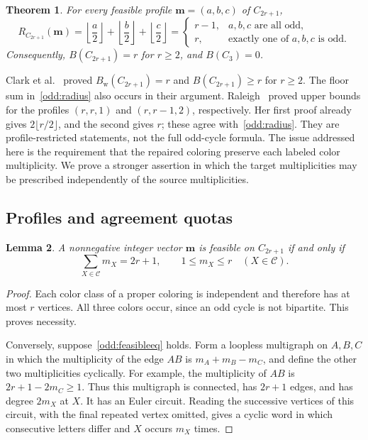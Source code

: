 \documentclass[10pt,a4paper]{amsart}
\numberwithin{equation}{section}
\newtheorem{theorem}{Theorem}[section]
\newtheorem{lemma}[theorem]{Lemma}
\theoremstyle{definition}
\theoremstyle{remark}
\begin{document}
\begin{theorem}\label{odd:main}
For every feasible profile $\mathbf m=(a,b,c)$ of $C_{2r+1}$,
\begin{equation}\label{odd:radius}
R_{C_{2r+1}}(\mathbf m)
=\left\lfloor\frac a2\right\rfloor
 +\left\lfloor\frac b2\right\rfloor
 +\left\lfloor\frac c2\right\rfloor
=\begin{cases}
r-1,&a,b,c\text{ are all odd},\\
r,&\text{exactly one of }a,b,c\text{ is odd}.
\end{cases}
\end{equation}
Consequently,
$B(C_{2r+1})=r$ for $r\ge2$, and $B(C_3)=0$.
\end{theorem}


Clark et al.~\cite[Proposition~3.5 and Corollary~3.6]{clark2006}
proved $B_{\mathrm w}(C_{2r+1})=r$ and $B(C_{2r+1})\ge r$ for $r\ge2$.
The floor sum in~\eqref{odd:radius} also occurs in their argument.
Raleigh~\cite[Theorems~7--8]{raleigh2018} proved upper bounds for the
profiles $(r,r,1)$ and $(r,r-1,2)$, respectively. Her first proof
already gives $2\lfloor r/2\rfloor$, and the second gives $r$;
these agree with~\eqref{odd:radius}. They are profile-restricted
statements, not the full odd-cycle formula.
The issue addressed here is the requirement that the repaired coloring
preserve each labeled color multiplicity. We prove a stronger assertion
in which the target multiplicities may be prescribed independently of
the source multiplicities.

\subsection{Profiles and agreement quotas}

\begin{lemma}\label{odd:feasible}
A nonnegative integer vector $\mathbf m$ is feasible on $C_{2r+1}$
if and only if
\begin{equation}\label{odd:feasibleeq}
\sum_{X\in\mathcal C}m_X=2r+1,
\qquad 1\le m_X\le r\quad(X\in\mathcal C).
\end{equation}
\end{lemma}
\begin{proof}
Each color class of a proper coloring is independent and therefore has
at most $r$ vertices. All three colors occur, since an odd cycle is not
bipartite. This proves necessity.

Conversely, suppose~\eqref{odd:feasibleeq} holds. Form a loopless
multigraph on $A,B,C$ in which the multiplicity of the edge $AB$ is
$m_A+m_B-m_C$, and define the other two multiplicities cyclically.
For example, the multiplicity of $AB$ is $2r+1-2m_C\ge1$.
Thus this multigraph is connected, has $2r+1$ edges, and has degree
$2m_X$ at $X$. It has an Euler circuit. Reading the successive vertices
of this circuit, with the final repeated vertex omitted, gives a cyclic
word in which consecutive letters differ and $X$ occurs $m_X$ times.
\end{proof}
\end{document}
